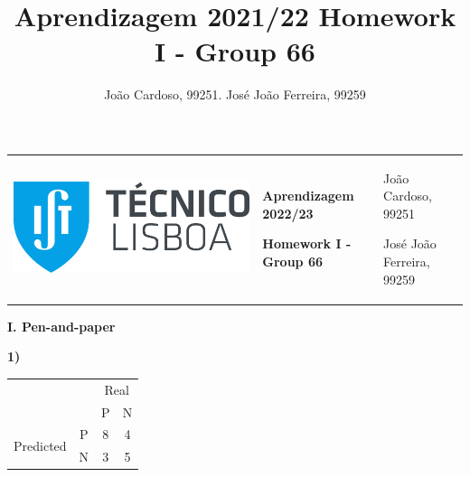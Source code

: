 \documentclass[11pt,a4paper]{article}
\title{Aprendizagem 2021/22 Homework I - Group 66}
\author{João Cardoso, 99251. José João Ferreira, 99259}
\begin{document}
\color{darkgray}
\hspace{-8.25mm}
\begin{tabularx}{1.09\textwidth} {>{\raggedright\arraybackslash}X >{\centering\arraybackslash}X >{\raggedleft\arraybackslash}X}
  \includegraphics[scale=0.2]{tecnico.pdf} &
  \textbf{Aprendizagem 2022/23} \par \textbf{Homework I - Group 66} &
  João Cardoso, 99251 \par José João Ferreira, 99259
\end{tabularx}
\color{black}

\begin{center}
\textbf{I. Pen-and-paper}
\end{center}

\begin{flushleft}
\textbf{1)}
\small
\begin{tabular}{llcc}
                                                  &                        & \multicolumn{2}{c}{Real}                        \\ \cline{3-4} 
                                                  & \multicolumn{1}{l|}{}  & \multicolumn{1}{c|}{P} & \multicolumn{1}{c|}{N} \\ \cline{2-4} 
  \multicolumn{1}{c|}{\multirow{2}{*}{Predicted}} & \multicolumn{1}{c|}{P} & \multicolumn{1}{c|}{8} & \multicolumn{1}{c|}{4} \\ \cline{2-4} 
  \multicolumn{1}{c|}{}                           & \multicolumn{1}{c|}{N} & \multicolumn{1}{c|}{3} & \multicolumn{1}{c|}{5} \\ \cline{2-4} 
\end{tabular}

\normalsize
\end{flushleft}
\end{document}
